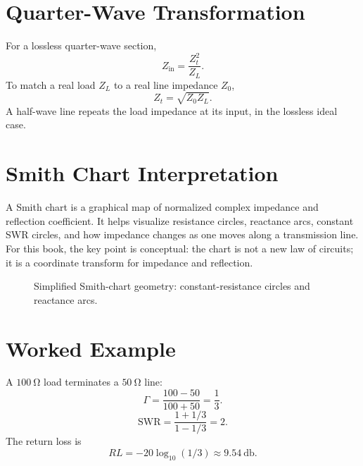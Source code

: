 \section{Quarter-Wave Transformation}
For a lossless quarter-wave section,
\[
Z_{\mathrm{in}}=\frac{Z_t^2}{Z_L}.
\]
To match a real load \(Z_L\) to a real line impedance \(Z_0\),
\[
Z_t=\sqrt{Z_0Z_L}.
\]
A half-wave line repeats the load impedance at its input, in the lossless ideal
case.

\section{Smith Chart Interpretation}
A Smith chart is a graphical map of normalized complex impedance and reflection
coefficient. It helps visualize resistance circles, reactance arcs, constant
SWR circles, and how impedance changes as one moves along a transmission line.
For this book, the key point is conceptual: the chart is not a new law of
circuits; it is a coordinate transform for impedance and reflection.

\begin{figure}[htbp]
\centering
{}
\caption{Simplified Smith-chart geometry: constant-resistance circles and reactance arcs.}
\end{figure}

\section{Worked Example}
A \(\SI{100}{\ohm}\) load terminates a \(\SI{50}{\ohm}\) line:
\[
\Gamma=\frac{100-50}{100+50}=\frac{1}{3}.
\]
\[
\mathrm{SWR}=\frac{1+1/3}{1-1/3}=2.
\]
The return loss is
\[
RL=-20\log_{10}(1/3)\approx \SI{9.54}{\decibel}.
\]
